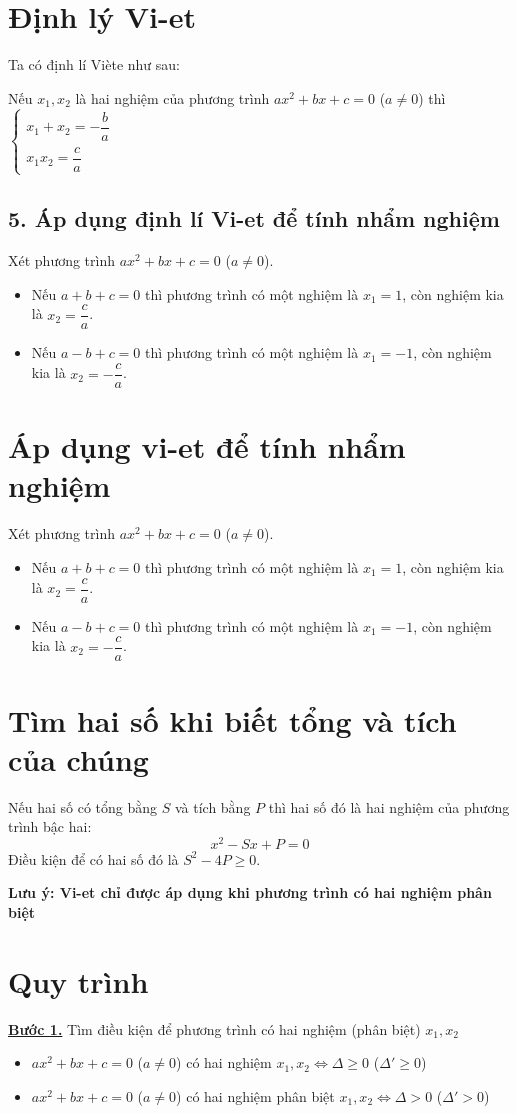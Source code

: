 \documentclass[12pt,a4paper]{extarticle}
\begin{document}
\section{Định lý Vi-et}
Ta có định lí Viète như sau:

\noindent Nếu $x_1, x_2$ là hai nghiệm của phương trình $ax^2 + bx + c = 0$ ($a \neq 0$) thì $\begin{cases} x_1 + x_2 = -\dfrac{b}{a} \\[8pt] x_1x_2 = \dfrac{c}{a} \end{cases}$

\subsection*{5. Áp dụng định lí Vi-et để tính nhẩm nghiệm}
Xét phương trình $ax^2 + bx + c = 0$ ($a \neq 0$).

\begin{itemize}
    \item Nếu $a + b + c = 0$ thì phương trình có một nghiệm là $x_1 = 1$, còn nghiệm kia là $x_2 = \dfrac{c}{a}$.
    \item Nếu $a - b + c = 0$ thì phương trình có một nghiệm là $x_1 = -1$, còn nghiệm kia là $x_2 = -\dfrac{c}{a}$.
\end{itemize}
\section{Áp dụng vi-et để tính nhẩm nghiệm}
Xét phương trình $ax^2 + bx + c = 0$ ($a \neq 0$).

\begin{itemize}
    \item Nếu $a + b + c = 0$ thì phương trình có một nghiệm là $x_1 = 1$, còn nghiệm kia là $x_2 = \dfrac{c}{a}$.
    \item Nếu $a - b + c = 0$ thì phương trình có một nghiệm là $x_1 = -1$, còn nghiệm kia là $x_2 = -\dfrac{c}{a}$.
\end{itemize}
\section{Tìm hai số khi biết tổng và tích của chúng}
Nếu hai số có tổng bằng $S$ và tích bằng $P$ thì hai số đó là hai nghiệm của phương trình bậc hai:
\[x^2 - Sx + P = 0\]
Điều kiện để có hai số đó là $S^2 - 4P \geq 0$.

\textbf{\large{\textcolor{red!80!black}{Lưu ý: Vi-et chỉ được áp dụng khi phương trình có hai nghiệm phân biệt}}}
\section{Quy trình}
\noindent\underline{\textbf{Bước 1.}} Tìm điều kiện để phương trình có hai nghiệm (phân biệt) $x_1, x_2$
\begin{itemize}
    \item $ax^2 + bx + c = 0$ ($a \neq 0$) có hai nghiệm $x_1, x_2 \iff \Delta \geq 0$ ($\Delta' \geq 0$)
    \item $ax^2 + bx + c = 0$ ($a \neq 0$) có hai nghiệm phân biệt $x_1, x_2 \iff \Delta > 0$ ($\Delta' > 0$)
\end{itemize}
\end{document}

